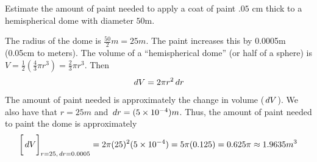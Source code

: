 \documentclass[nooutcomes,handout]{ximera}
\begin{document}
\begin{problem}

  Estimate the amount of paint needed to apply a coat of paint $.05$ cm thick to a hemispherical dome with diameter $50$m.
 
  \begin{freeResponse}
    The radius of the dome is $\frac{50}{2}m=25m$.
    The paint increases this by 0.0005m (0.05cm to meters).
    The volume of a ``hemispherical dome'' (or half of a sphere) is $V = \frac{1}{2} \left(\frac{4}{3} \pi r^3 \right) = \frac{2}{3} \pi r^3$.
    Then
    $$ \,d V = 2 \pi r^2 \,d r  $$
    The amount of paint needed is approximately the change in volume ($\,d V$).
    We also have that $r=25m$ and $\,d r = (5 \times 10^{-4}) m$.
    Thus, the amount of paint needed to paint the dome is approximately
    $$ \bigg[ \,d V \bigg]_{r=25,\,d r = 0.0005} = 2 \pi (25)^2 (5 \times 10^{-4}) = 5 \pi (0.125) = 0.625 \pi \approx 1.9635 m^3$$
    
 
  \end{freeResponse}
\end{problem}
\end{document}
